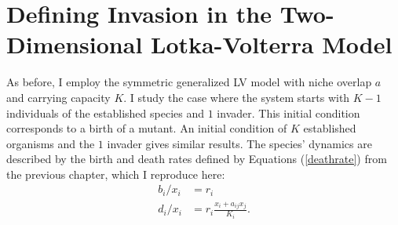 \iffalse
Transient co-existence during the fixation/extinction process of immigrants/mutants has also been proposed as a mechanism for observed biodiversity in a number of contexts \cite{Kimura1964,Dias1996,Hubbell2001,Chesson2000,Leibold2006,Kessler2015,Vega2017}. 
The extent of this biodiversity is constrained by the interplay between the residence times of these invaders and the rate at which they appear in a settled population. 
In the previous sections we calculated the fixation times in the two species system starting from the deterministically stable fixed point. 
In this section we investigate the complementary problem of robustness of a stable population of one species with respect to an invasion of another species, arising either through mutation or immigration, and investigate the effect of niche overlap and system size on the probability and mean times of successful and failed invasions. 
\fi


\section{Defining Invasion in the Two-Dimensional Lotka-Volterra Model}

As before, I employ the symmetric generalized LV model with niche overlap $a$ and carrying capacity $K$. 
I study the case where the system starts with $K-1$ individuals of the established species and $1$ invader. 
This initial condition corresponds to a birth of a mutant. 
An initial condition of $K$ established organisms and the $1$ invader gives similar results. 
The species' dynamics are described by the birth and death rates defined by Equations (\ref{deathrate}) from the previous chapter, which I reproduce here:
\begin{align*}
	b_i/x_i &= r_i \\
	d_i/x_i &= r_i\frac{x_i+a_{ij}x_j}{K_i}. 
\end{align*}

